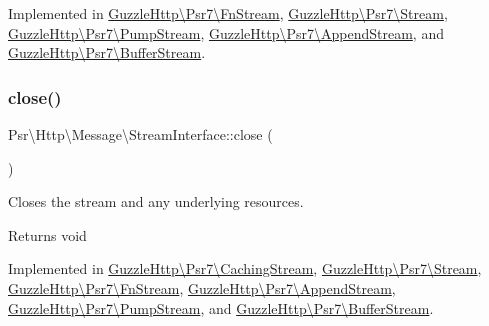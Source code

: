 Implemented in \hyperlink{classGuzzleHttp_1_1Psr7_1_1FnStream_afa1de61c8570fc1009d328008249c2fc}{Guzzle\+Http\textbackslash{}\+Psr7\textbackslash{}\+Fn\+Stream}, \hyperlink{classGuzzleHttp_1_1Psr7_1_1Stream_a8decf1a3294743f9bea9c47e16b25375}{Guzzle\+Http\textbackslash{}\+Psr7\textbackslash{}\+Stream}, \hyperlink{classGuzzleHttp_1_1Psr7_1_1PumpStream_a2dbe76356aa5c4552a31ca4c705c579e}{Guzzle\+Http\textbackslash{}\+Psr7\textbackslash{}\+Pump\+Stream}, \hyperlink{classGuzzleHttp_1_1Psr7_1_1AppendStream_a372f34990a4d8004e6576144eb2182a8}{Guzzle\+Http\textbackslash{}\+Psr7\textbackslash{}\+Append\+Stream}, and \hyperlink{classGuzzleHttp_1_1Psr7_1_1BufferStream_a263174c64e3f1690c1234de871312dfb}{Guzzle\+Http\textbackslash{}\+Psr7\textbackslash{}\+Buffer\+Stream}.

\mbox{\label{interfacePsr_1_1Http_1_1Message_1_1StreamInterface_a0bbd0c821da0ee0c319f9867ff77c598}} 
\subsubsection{\texorpdfstring{close()}{close()}}
{\footnotesize\ttfamily Psr\textbackslash{}\+Http\textbackslash{}\+Message\textbackslash{}\+Stream\+Interface\+::close (\begin{DoxyParamCaption}{ }\end{DoxyParamCaption})}

Closes the stream and any underlying resources.

\begin{DoxyReturn}{Returns}
void 
\end{DoxyReturn}


Implemented in \hyperlink{classGuzzleHttp_1_1Psr7_1_1CachingStream_ac135bf39923eb56263280d2e63c8bc96}{Guzzle\+Http\textbackslash{}\+Psr7\textbackslash{}\+Caching\+Stream}, \hyperlink{classGuzzleHttp_1_1Psr7_1_1Stream_a68ef1ae70e99df7f8553083e66e900d9}{Guzzle\+Http\textbackslash{}\+Psr7\textbackslash{}\+Stream}, \hyperlink{classGuzzleHttp_1_1Psr7_1_1FnStream_a45793fd71b5136c5dbfcac2c25950cc4}{Guzzle\+Http\textbackslash{}\+Psr7\textbackslash{}\+Fn\+Stream}, \hyperlink{classGuzzleHttp_1_1Psr7_1_1AppendStream_acba72b0a13e6b2ad6c6cc2a6eeea47cd}{Guzzle\+Http\textbackslash{}\+Psr7\textbackslash{}\+Append\+Stream}, \hyperlink{classGuzzleHttp_1_1Psr7_1_1PumpStream_a08eeaef85573c150498566ffa9e1f872}{Guzzle\+Http\textbackslash{}\+Psr7\textbackslash{}\+Pump\+Stream}, and \hyperlink{classGuzzleHttp_1_1Psr7_1_1BufferStream_a1a5a3b008a4b806c90125ad4804973be}{Guzzle\+Http\textbackslash{}\+Psr7\textbackslash{}\+Buffer\+Stream}.

